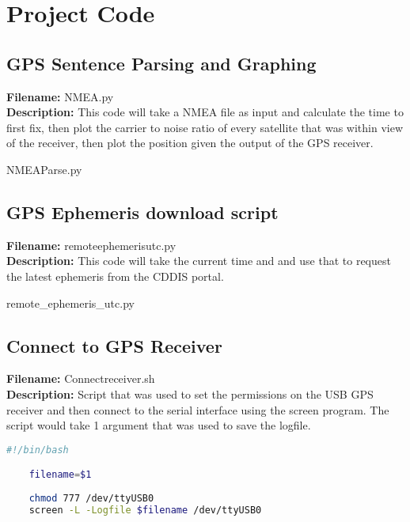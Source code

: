 
\chapter{Project Code} %

\label{AppendixA} %

\section{GPS Sentence Parsing and Graphing} \label{sec:NMEACode}
\textbf{Filename:} NMEA.py\\
\textbf{Description:} This code will take a NMEA file as input and calculate the time to first fix, then plot the carrier to noise ratio of every satellite that was
within view of the receiver, then plot the position given the output of the GPS receiver.

\begin{lstinputlisting}[language=Python, caption=Python code to parse the receiver NMEA sentence and produce graphs]{NMEAParse.py}
\end{lstinputlisting}

\section{GPS Ephemeris download script} \label{sec:EphemerisCode}
\textbf{Filename:} remote\textunderscore ephemeris\textunderscore utc.py\\
\textbf{Description:} This code will take the current time and and use that to request the latest ephemeris from the CDDIS portal.

\begin{lstinputlisting}[language=Python, caption=Python code to retreive the latest RINEX file from the CDDIS servers]{remote_ephemeris_utc.py}
\end{lstinputlisting}

\section{Connect to GPS Receiver} \label{sec:GPSConnect}
\textbf{Filename:} Connect\textunderscore receiver.sh\\
\textbf{Description:} Script that was used to set the permissions on the USB GPS receiver and then connect to the serial interface using the screen program. The script
would take 1 argument that was used to save the logfile.

\begin{lstlisting}[language=bash, caption=Bash script to connect to USB GPS receiver]
    #!/bin/bash

    filename=$1
    
    chmod 777 /dev/ttyUSB0
    screen -L -Logfile $filename /dev/ttyUSB0
   
\end{lstlisting}
